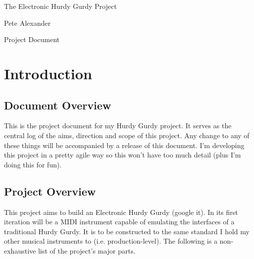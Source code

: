 \documentclass[12pt]{article}
\begin{document}


\begin{titlepage}

    \begin{center}
        
        {\LARGE The Electronic Hurdy Gurdy Project}

        {\Large Pete Alexander}
        \vspace{5cm}
        
        {\LARGE Project Document}

    \end{center}
    \restoregeometry
\end{titlepage}



\newpage
\setcounter{tocdepth}{2}

\newpage
\tableofcontents
\newpage

\setcounter{page}{1}
\pagestyle{plain}

\section{Introduction}
\subsection{Document Overview}
This is the project document for my Hurdy Gurdy project. 
It serves as the central log of the aims, direction and scope of this project.
Any change to any of these things will be accompanied by a release of this document. 
I'm developing this project in a pretty agile way so this won't have too much detail (plus I'm doing this for fun).

\subsection{Project Overview}
This project aims to build an Electronic Hurdy Gurdy (google it).
In its first iteration will be a MIDI instrument capable of emulating the interfaces of a traditional Hurdy Gurdy. 
It is to be constructed to the same standard I hold my other musical instruments to (i.e. production-level).
The following is a non-exhaustive list of the project's major parts.
\end{document}
